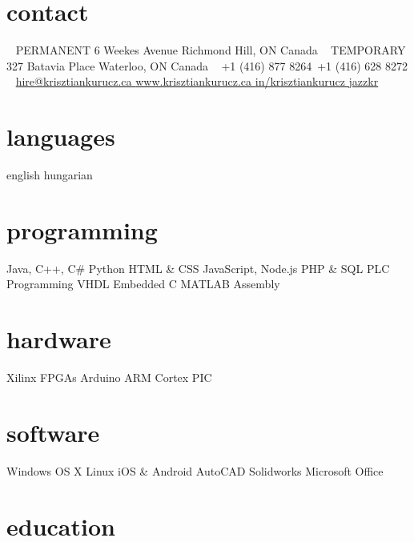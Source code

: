 \documentclass[hidelinks]{kkurucz-cv}
\begin{document}


\begin{aside} %
\section{contact}
~
{\headingfont PERMANENT}
6 Weekes Avenue
Richmond Hill, ON
Canada
~
{\headingfont TEMPORARY}
327 Batavia Place
Waterloo, ON
Canada
~
{+1 (416) 877 8264\hspace{1.5mm}\mobile}\,
{+1 (416) 628 8272 \phone}
~
\href{mailto:hire@krisztiankurucz.ca}{hire@krisztiankurucz.ca }\mail
\href{http://www.krisztiankurucz.ca}{www.krisztiankurucz.ca }\website
\href{http://ca.linkedin.com/in/krisztiankurucz}{in/krisztiankurucz }\linkedin
\href{http://www.github.com/jazzkr}{jazzkr }\github
\section{languages}
english 
hungarian
\section{programming}
Java, C++, C\#
Python
HTML \& CSS
JavaScript, Node.js
PHP \& SQL
PLC Programming
VHDL
Embedded C
MATLAB
Assembly
\section{hardware}
Xilinx FPGAs
Arduino
ARM Cortex
PIC
\section{software}
Windows
OS X
Linux
iOS \& Android
AutoCAD
Solidworks
Microsoft Office
\end{aside}


\section{education}
\end{document}

